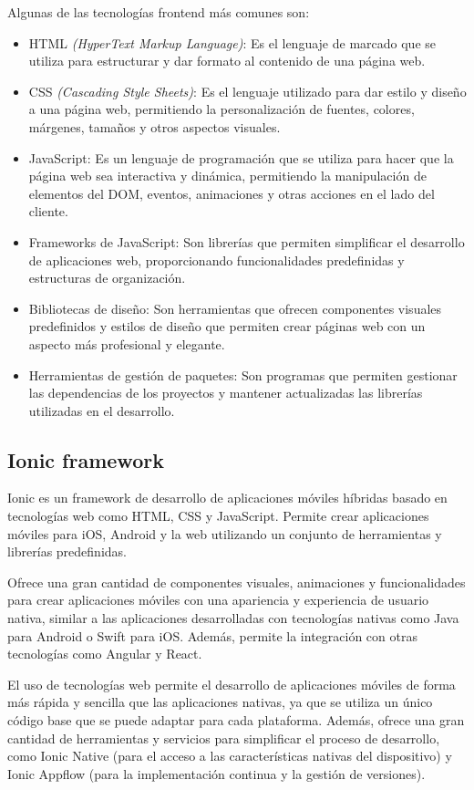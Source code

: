 Algunas de las tecnologías frontend más comunes son:
\begin{itemize}
	\item HTML \textit{(HyperText Markup Language)}: Es el lenguaje de marcado que se utiliza para estructurar y dar formato al contenido de una página web.
	\item CSS \textit{(Cascading Style Sheets)}: Es el lenguaje utilizado para dar estilo y diseño a una página web, permitiendo la personalización de fuentes, colores, márgenes, tamaños y otros aspectos visuales.
	\item JavaScript: Es un lenguaje de programación que se utiliza para hacer que la página web sea interactiva y dinámica, permitiendo la manipulación de elementos del DOM, eventos, animaciones y otras acciones en el lado del cliente.
	\item Frameworks de JavaScript: Son librerías que permiten simplificar el desarrollo de aplicaciones web, proporcionando funcionalidades predefinidas y estructuras de organización.
	\item Bibliotecas de diseño: Son herramientas que ofrecen componentes visuales predefinidos y estilos de diseño que permiten crear páginas web con un aspecto más profesional y elegante.
	\item Herramientas de gestión de paquetes: Son programas que permiten gestionar las dependencias de los proyectos y mantener actualizadas las librerías utilizadas en el desarrollo.	
\end{itemize}

\subsection{Ionic framework}
\label{subsec:ionic}

Ionic es un framework de desarrollo de aplicaciones móviles híbridas basado en tecnologías web como HTML, CSS y JavaScript. Permite crear aplicaciones móviles para iOS, Android y la web utilizando un conjunto de herramientas y librerías predefinidas.

Ofrece una gran cantidad de componentes visuales, animaciones y funcionalidades para crear aplicaciones móviles con una apariencia y experiencia de usuario nativa, similar a las aplicaciones desarrolladas con tecnologías nativas como Java para Android o Swift para iOS. Además, permite la integración con otras tecnologías como Angular y React.

El uso de tecnologías web permite el desarrollo de aplicaciones móviles de forma más rápida y sencilla que las aplicaciones nativas, ya que se utiliza un único código base que se puede adaptar para cada plataforma. Además, ofrece una gran cantidad de herramientas y servicios para simplificar el proceso de desarrollo, como Ionic Native (para el acceso a las características nativas del dispositivo) y Ionic Appflow (para la implementación continua y la gestión de versiones).


